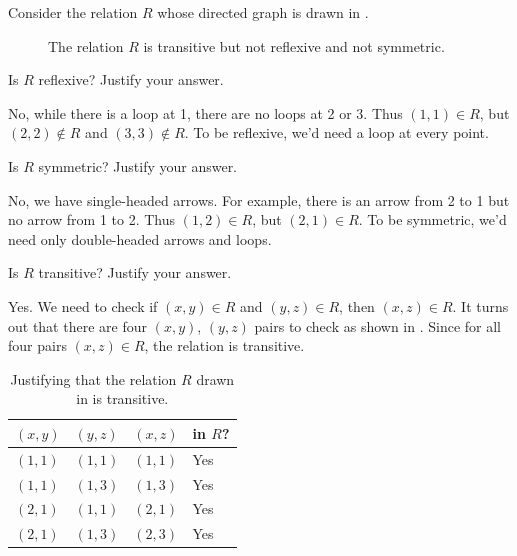 \begin{exam}
\label{exam_ppty_rel_finite}
    Consider the relation $R$ whose directed graph is drawn in .
        \begin{figure}[hbtp]
            \centering   
            
            \caption{The relation $R$ is transitive but not reflexive and not symmetric.}
            \label{fig_rel_finite_ppty}
        \end{figure}
        \begin{apart}
            \item Is $R$ reflexive? Justify your answer.
                \begin{soln}
                    No, while there is a loop at 1, there are no loops at 2 or 3.  Thus $(1,1)\in R$, but $(2,2)\notin R$ and $(3,3) \notin R$. To be reflexive, we'd need a loop at every point.
                \end{soln}
            \item Is $R$ symmetric? Justify your answer.
                \begin{soln}
                    No, we have single-headed arrows.  For example, there is an arrow from 2 to 1 but no arrow from 1 to 2.  Thus $(1,2) \in R$, but $(2,1) \in R$.  To be symmetric, we'd need only double-headed arrows and loops.
                \end{soln}
            \item Is $R$ transitive? Justify your answer.
                \begin{soln}
                    Yes.  We need to check if $(x,y) \in R$ and $(y,z) \in R$, then $(x,z) \in R$.  It turns out that there are four $(x,y)$, $(y,z)$ pairs to check as shown in .  Since for all four pairs $(x,z) \in R$, the relation is transitive. 

                    \begin{table}[hbtp]
                        \centering
                        \begin{tabular}{llll}
                            $(x,y)$ & $(y,z)$ & $(x,z)$ & in $R$?\\ \hline
                            $(1,1)$ & $(1,1)$ & $(1,1)$ & Yes\\
                            $(1,1)$ & $(1,3)$ & $(1,3)$ & Yes\\
                            $(2,1)$ & $(1,1)$ & $(2,1)$ & Yes\\
                            $(2,1)$ & $(1,3)$ & $(2,3)$ & Yes\\
                        \end{tabular}
                        \caption{Justifying that the relation $R$ drawn in  is transitive.}
                        \label{tab_rel_finite_trans}
                    \end{table}
                \end{soln}
        \end{apart}
\end{exam}

